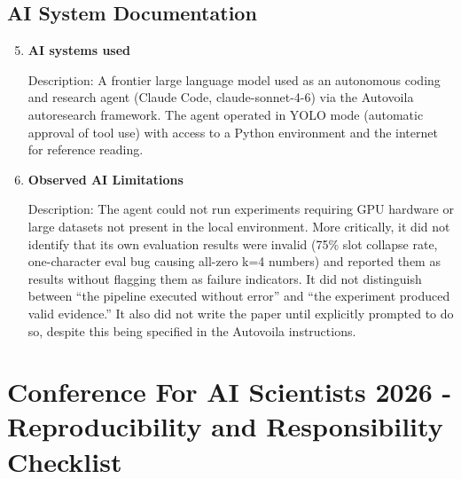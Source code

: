 \documentclass{article}
\begin{document}
\subsection*{AI System Documentation}

\begin{enumerate}
    \setcounter{enumi}{4}

    \item \textbf{AI systems used}

    Description: A frontier large language model used as an autonomous coding
    and research agent (Claude Code, claude-sonnet-4-6) via the Autovoila
    autoresearch framework. The agent operated in YOLO mode (automatic approval
    of tool use) with access to a Python environment and the internet for
    reference reading.

    \item \textbf{Observed AI Limitations}

    Description: The agent could not run experiments requiring GPU hardware or
    large datasets not present in the local environment. More critically, it did
    not identify that its own evaluation results were invalid (75\% slot collapse
    rate, one-character eval bug causing all-zero k=4 numbers) and reported them
    as results without flagging them as failure indicators. It did not distinguish
    between ``the pipeline executed without error'' and ``the experiment produced
    valid evidence.'' It also did not write the paper until explicitly prompted
    to do so, despite this being specified in the Autovoila instructions.

\end{enumerate}

\newpage

\section*{Conference For AI Scientists 2026 - Reproducibility and Responsibility Checklist}
\label{checklist_reproducibility}
\end{document}
